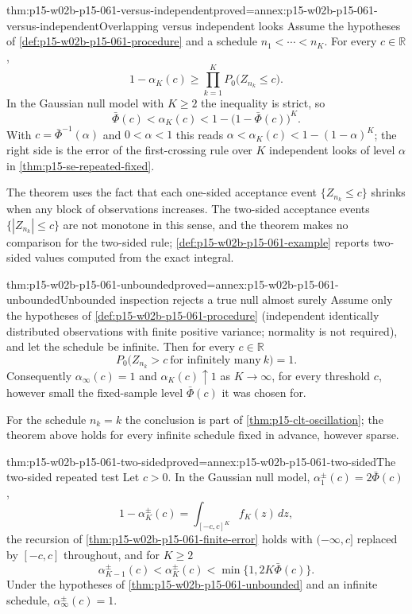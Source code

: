 \begin{hbtheorem}{thm:p15-w02b-p15-061-versus-independent}{proved=annex:p15-w02b-p15-061-versus-independent}{Overlapping versus independent looks}
Assume the hypotheses of \cref{def:p15-w02b-p15-061-procedure} and a
schedule \(n_1<\cdots<n_K\). For every \(c\in\mathbb R\),
\[
 1-\alpha_K(c)\geq\prod_{k=1}^KP_0\bigl(Z_{n_k}\leq c\bigr).
\]
In the Gaussian null model with \(K\geq2\) the inequality is strict, so
\[
 \bar\Phi(c)<\alpha_K(c)<1-\bigl(1-\bar\Phi(c)\bigr)^K .
\]
With \(c=\bar\Phi^{-1}(\alpha)\) and \(0<\alpha<1\) this reads
\(\alpha<\alpha_K(c)<1-(1-\alpha)^K\); the right side is the error of
the first-crossing rule over \(K\) independent looks of level \(\alpha\)
in \cref{thm:p15-se-repeated-fixed}.
\end{hbtheorem}

The theorem uses the fact that each one-sided acceptance event
\(\{Z_{n_k}\leq c\}\) shrinks when any block of observations increases.
The two-sided acceptance events \(\{|Z_{n_k}|\leq c\}\) are not monotone
in this sense, and the theorem makes no comparison for the two-sided rule;
\cref{def:p15-w02b-p15-061-example} reports two-sided values computed from
the exact integral.

\begin{hbtheorem}{thm:p15-w02b-p15-061-unbounded}{proved=annex:p15-w02b-p15-061-unbounded}{Unbounded inspection rejects a true null almost surely}
Assume only the hypotheses of \cref{def:p15-w02b-p15-061-procedure}
(independent identically distributed observations with finite positive
variance; normality is not required), and let the schedule be infinite.
Then for every \(c\in\mathbb R\)
\[
 P_0\bigl(Z_{n_k}>c\ \text{for infinitely many}\ k\bigr)=1 .
\]
Consequently \(\alpha_\infty(c)=1\) and \(\alpha_K(c)\uparrow1\) as
\(K\to\infty\), for every threshold \(c\), however small the
fixed-sample level \(\bar\Phi(c)\) it was chosen for.
\end{hbtheorem}

For the schedule \(n_k=k\) the conclusion is part of
\cref{thm:p15-clt-oscillation}; the theorem above holds for every
infinite schedule fixed in advance, however sparse.

\begin{hbcorollary}{thm:p15-w02b-p15-061-two-sided}{proved=annex:p15-w02b-p15-061-two-sided}{The two-sided repeated test}
Let \(c>0\). In the Gaussian null model,
\(\alpha^{\pm}_1(c)=2\bar\Phi(c)\),
\[
 1-\alpha^{\pm}_K(c)=\int_{[-c,c]^K}f_K(z)\,dz,
\]
the recursion of \cref{thm:p15-w02b-p15-061-finite-error} holds with
\((-\infty,c]\) replaced by \([-c,c]\) throughout, and for \(K\geq2\)
\[
 \alpha^{\pm}_{K-1}(c)<\alpha^{\pm}_K(c)<\min\{1,2K\bar\Phi(c)\}.
\]
Under the hypotheses of \cref{thm:p15-w02b-p15-061-unbounded} and an
infinite schedule, \(\alpha^{\pm}_\infty(c)=1\).
\end{hbcorollary}

